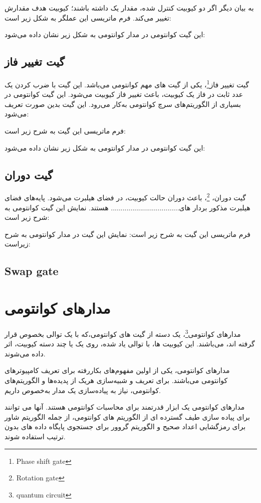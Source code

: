 \documentclass{book}
\begin{document}
به بیان دیگر اگر دو کیوبیت کنترل شده،‌ مقدار یک داشته باشند؛‌ کیوبیت هدف مقدارش تغییر می‌کند.
فرم ماتریسی این عملگر به شکل زیر است:

این گیت کوانتومی در مدار کوانتومی به شکل زیر نشان داده می‌شود:

\subsection*{گیت تغییر فاز}
گیت تغییر فاز\footnote{Phase shift gate}، یکی از گیت های مهم کوانتومی‌ می‌باشد. این گیت با ضرب کردن یک عدد ثابت در فاز یک کیوبیت، باعث تغییر فاز کیوبیت می‌شود. این گیت کوانتومی در بسیاری از الگوریتم‌های سرچ کوانتومی به‌کار می‌رود. این گیت بدین صورت تعریف می‌شود:

فرم ماتریسی این گیت به شرح زیر است:

این گیت کوانتومی در مدار کوانتومی به شکل زیر نشان داده می‌شود:

\subsection*{گیت دوران}
گیت دوران، \footnote{Rotation gate}، باعث دوران حالت کیوبیت، در فضای هیلبرت ‌می‌شود. پایه‌های فضای هیلبرت مذکور بردار های................................... هستند. نمایش این گیت کوانتومی به شرح زیر است:

فرم ماتریسی این گیت به شرح زیر است:
نمایش این گیت در مدار کوانتومی به شرح زیراست:


\subsection{Swap gate}



\section{مدار‌های کوانتومی}
مدار‌های ‌کوانتومی\footnote{quantum circuit}، یک دسته از گیت ها‌ی کوانتومی،که با یک توالی بخصوص قرار گرفته اند، ‌می‌باشند. این کیوبیت ها، با توالی یاد شده، روی یک یا چند دسته کیوبیت، اثر داده ‌می‌شوند. 

مدار‌های کوانتومی، یکی از اولین مفهوم‌های بکار‌رفته برای تعریف کامپیوتر‌های کوانتومی‌ می‌باشند. برای تعریف و شبیه‌سازی هریک از پدیده‌ها و الگوریتم‌های کوانتومی، نیاز به پیاده‌سازی یک مدار به‌خصوص داریم.


مدارهای کوانتومی یک ابزار قدرتمند برای محاسبات کوانتومی هستند. آنها می توانند برای پیاده سازی طیف گسترده ای از الگوریتم های کوانتومی، از جمله الگوریتم شاور برای رمزگشایی اعداد صحیح و الگوریتم گروور برای جستجوی پایگاه داده های بدون ترتیب استفاده شوند.
\end{document}
